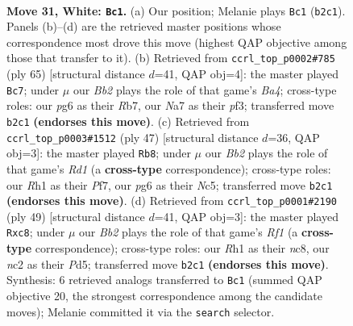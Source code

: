 \documentclass[11pt]{article}
\begin{document}
\clearpage

\begin{figure}[p]\centering
\begin{subfigure}{0.46\textwidth}\centering
\resizebox{\linewidth}{!}{%
\newchessgame
\chessboard[
  setfen={3k2r1/Npp1p2p/6p1/p1n5/5P1P/2P5/PBn2PK1/7R w - - 7 31},
  showmover=false,
  pgfstyle=straightmove, color=movearrow, markmove={b2-c1}
]}
\caption{}
\end{subfigure}\hfill
\begin{subfigure}{0.46\textwidth}\centering
\resizebox{\linewidth}{!}{%
\newchessgame
\chessboard[
  setfen={6k1/1r3p2/4pp2/b1p4p/P1N5/1P3P2/5P1P/R5K1 b - - 5 33},
  showmover=false,
  pgfstyle=straightmove, color=movearrow, markmove={a5-c7}
]}
\caption{}
\end{subfigure}
\\[4pt]
\begin{subfigure}{0.46\textwidth}\centering
\resizebox{\linewidth}{!}{%
\newchessgame
\chessboard[
  setfen={3r4/2p1kppp/8/1Pn5/2N1p1P1/4P3/5P1P/R5K1 b - - 0 24},
  showmover=false,
  pgfstyle=straightmove, color=movearrow, markmove={d8-b8}
]}
\caption{}
\end{subfigure}\hfill
\begin{subfigure}{0.46\textwidth}\centering
\resizebox{\linewidth}{!}{%
\newchessgame
\chessboard[
  setfen={2N2r1k/5p1p/p4p2/1p1p4/5PP1/P7/1PP4P/1K4R1 b - - 0 25},
  showmover=false,
  pgfstyle=straightmove, color=movearrow, markmove={f8-c8}
]}
\caption{}
\end{subfigure}
\caption{\textbf{Move 31, White: \texttt{Bc1}.} (a) Our position; Melanie plays \texttt{Bc1} (\texttt{b2c1}). Panels (b)--(d) are the retrieved master positions whose correspondence most drove this move (highest QAP objective among those that transfer to it). (b) Retrieved from \texttt{ccrl\_top\_p0002\#785} (ply 65) [structural distance $d$=41, QAP obj=4]: the master played \texttt{Bc7}; under $\mu$ our \emph{Bb2} plays the role of that game's \emph{Ba4}; cross-type roles: our \emph{p}g6 as their \emph{R}b7, our \emph{N}a7 as their \emph{p}f3; transferred move \texttt{b2c1} \textbf{(endorses this move)}. (c) Retrieved from \texttt{ccrl\_top\_p0003\#1512} (ply 47) [structural distance $d$=36, QAP obj=3]: the master played \texttt{Rb8}; under $\mu$ our \emph{Bb2} plays the role of that game's \emph{Rd1} (a \textbf{cross-type} correspondence); cross-type roles: our \emph{R}h1 as their \emph{P}f7, our \emph{p}g6 as their \emph{N}c5; transferred move \texttt{b2c1} \textbf{(endorses this move)}. (d) Retrieved from \texttt{ccrl\_top\_p0001\#2190} (ply 49) [structural distance $d$=41, QAP obj=3]: the master played \texttt{Rxc8}; under $\mu$ our \emph{Bb2} plays the role of that game's \emph{Rf1} (a \textbf{cross-type} correspondence); cross-type roles: our \emph{R}h1 as their \emph{n}c8, our \emph{n}c2 as their \emph{P}d5; transferred move \texttt{b2c1} \textbf{(endorses this move)}. Synthesis: 6 retrieved analogs transferred to \texttt{Bc1} (summed QAP objective 20, the strongest correspondence among the candidate moves); Melanie committed it via the \texttt{search} selector.}
\label{fig:thought-m60}
\end{figure}
\end{document}
